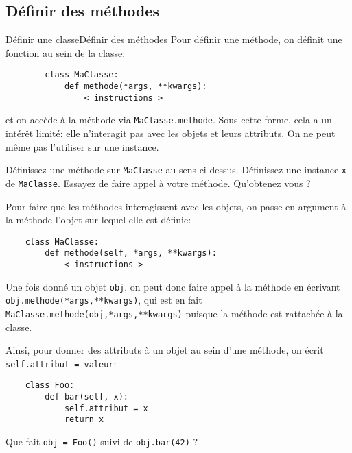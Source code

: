 \subsection{Définir des méthodes}

\begin{frame}[fragile]{Définir une classe}{Définir des méthodes}
	Pour définir une méthode, on définit une fonction au sein de la classe:\pause
	\begin{lstlisting}
		class MaClasse:
			def methode(*args, **kwargs):
				< instructions >
	\end{lstlisting}
	et on accède à la méthode via \lstinline|MaClasse.methode|. Sous cette forme, cela a un intérêt limité: elle n'interagit pas avec les objets et leurs attributs. On ne peut même pas l'utiliser sur une instance.\pause
	
	\begin{exem}
		Définissez une méthode sur \lstinline|MaClasse| au sens ci-dessus.
		Définissez une instance \lstinline|x| de \lstinline|MaClasse|. Essayez de faire appel à votre méthode. Qu'obtenez vous ?
	\end{exem}
\end{frame}

\begin{frame}[fragile]
	Pour faire que les méthodes interagissent avec les objets, on passe en argument à la méthode l'objet sur lequel elle est définie:\pause
	\begin{lstlisting}
	class MaClasse:
		def methode(self, *args, **kwargs):
			< instructions >
	\end{lstlisting}\pause
	
	Une fois donné un objet \lstinline|obj|, on peut donc faire appel à la méthode en écrivant \lstinline|obj.methode(*args,**kwargs)|, qui est en fait \lstinline|MaClasse.methode(obj,*args,**kwargs)| puisque la méthode est rattachée à la classe.
\end{frame}

\begin{frame}[fragile]
	Ainsi, pour donner des attributs à un objet au sein d'une méthode, on écrit \lstinline|self.attribut = valeur|:\pause
	\begin{exem}
	\begin{lstlisting}
	class Foo:
		def bar(self, x):
			self.attribut = x
			return x
	\end{lstlisting}
	Que fait \lstinline|obj = Foo()| suivi de \lstinline|obj.bar(42)| ?
	\end{exem}
\end{frame}



